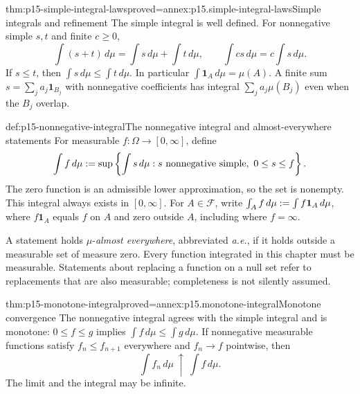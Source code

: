 \begin{hbtheorem}{thm:p15-simple-integral-laws}{proved=annex:p15.simple-integral-laws}{Simple integrals and refinement}
The simple integral is well defined. For nonnegative simple \(s,t\)
and finite \(c\geq0\),
\[
 \int(s+t)\,d\mu=\int s\,d\mu+\int t\,d\mu,\qquad
 \int cs\,d\mu=c\int s\,d\mu.
\]
If \(s\leq t\), then \(\int s\,d\mu\leq\int t\,d\mu\).
In particular \(\int\mathbf1_A\,d\mu=\mu(A)\). A finite sum
\(s=\sum_j a_j\mathbf1_{B_j}\) with nonnegative coefficients has
integral \(\sum_j a_j\mu(B_j)\) even when the \(B_j\) overlap.
\end{hbtheorem}

\begin{hbdefinition}{def:p15-nonnegative-integral}{The nonnegative integral and almost-everywhere statements}
For measurable \(f:\Omega\to[0,\infty]\), define
\[
 \int f\,d\mu\mathrel{:=}
 \sup\left\{\int s\,d\mu:s\text{ nonnegative simple},\ 0\leq s\leq f\right\}.
\]
The zero function is an admissible lower approximation, so the set is
nonempty. This integral always exists in \([0,\infty]\).
For \(A\in\mathcal F\), write
\(\int_A f\,d\mu\mathrel{:=}\int f\mathbf1_A\,d\mu\), where
\(f\mathbf1_A\) equals \(f\) on \(A\) and zero outside \(A\),
including where \(f=\infty\).

A statement holds \(\mu\)-\emph{almost everywhere}, abbreviated
\emph{a.e.}, if it holds outside a measurable set of measure zero.
Every function integrated in this chapter must be measurable. Statements
about replacing a function on a null set refer to replacements that are
also measurable; completeness is not silently assumed.
\end{hbdefinition}

\begin{hbtheorem}{thm:p15-monotone-integral}{proved=annex:p15.monotone-integral}{Monotone convergence}
The nonnegative integral agrees with the simple integral and is monotone:
\(0\leq f\leq g\) implies \(\int f\,d\mu\leq\int g\,d\mu\).
If nonnegative measurable functions satisfy \(f_n\leq f_{n+1}\)
everywhere and \(f_n\to f\) pointwise, then
\[
 \int f_n\,d\mu\ \uparrow\ \int f\,d\mu.
\]
The limit and the integral may be infinite.
\end{hbtheorem}

